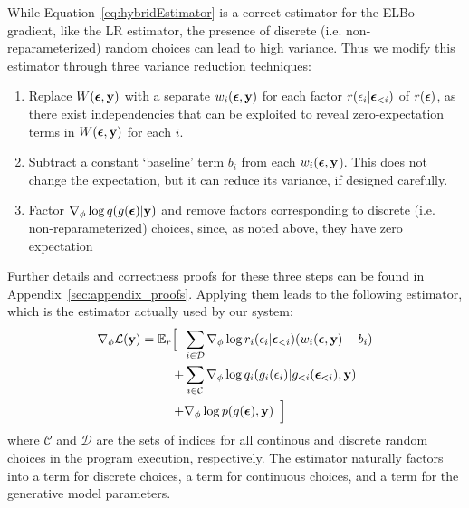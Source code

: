While Equation~\ref{eq:hybridEstimator} is a correct estimator for the ELBo gradient, like the LR estimator, the presence of discrete (i.e. non-reparameterized) random choices can lead to high variance. Thus we modify this estimator through three variance reduction techniques:
\begin{enumerate}
\item{Replace $W(\bm{\epsilon}, \mathbf{y})$ with a separate $w_i(\bm{\epsilon}, \mathbf{y})$ for each factor $r(\epsilon_i | \bm{\epsilon}_{<i})$ of $r(\bm{\epsilon})$, as there exist independencies that can be exploited to reveal zero-expectation terms in $W(\bm{\epsilon}, \mathbf{y})$ for each $i$.}
\item{Subtract a constant `baseline' term $b_i$ from each $w_i(\bm{\epsilon}, \mathbf{y}$). This does not change the expectation, but it can reduce its variance, if designed carefully.}
\item{Factor $\nabla_\phi \log q(g(\bm{\epsilon}) | \mathbf{y})$ and remove factors corresponding to discrete (i.e. non-reparameterized) choices, since, as noted above, they have zero expectation}
\end{enumerate}
Further details and correctness proofs for these three steps can be found in Appendix~\ref{sec:appendix_proofs}. Applying them leads to the following estimator, which is the estimator actually used by our system:
\begin{align}
\begin{split}
\nabla_\phi \mathcal{L}(\mathbf{y}) =
\mathbb{E}_{r} \Bigl[ \hspace{0.5em} &\sum_{i \in \mathcal{D}} \nabla_\phi \log r_i(\epsilon_i | \bm{\epsilon}_{<i}) ( w_i(\bm{\epsilon}, \mathbf{y}) - b_i ) \\
+ &\sum_{i \in \mathcal{C}} \nabla_\phi \log q_i(g_i(\epsilon_i) | g_{<i}(\bm{\epsilon}_{<i}), \mathbf{y}) \\
+ &\nabla_\phi \log p(g(\bm{\epsilon}), \mathbf{y}) \hspace{0.5em} \Bigr]
\end{split}
\label{eq:finalEstimator}
\end{align}
where $\mathcal{C}$ and $\mathcal{D}$ are the sets of indices for all continous and discrete random choices in the program execution, respectively.
The estimator naturally factors into a term for discrete choices, a term for continuous choices, and a term for the generative model parameters.

